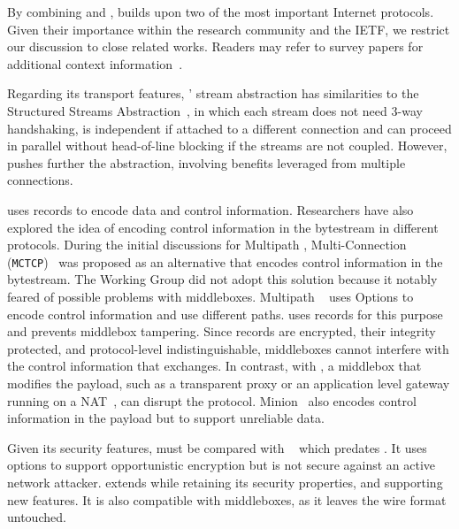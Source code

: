 
By combining \tcp and \tls, \tcpls builds upon two of the most important
Internet protocols. Given their importance within  the research community and the IETF, we restrict our discussion to close related works. Readers may refer to survey papers for additional  context
information~\cite{polese2019survey,li2016multipath,papastergiou2016ossifying}.

Regarding its transport features, \tcpls' stream abstraction has similarities to
the Structured Streams Abstraction~\cite{ford2007structured}, in which each
stream does not need 3-way handshaking, is independent if attached to a
different \tcp connection and can proceed in parallel without head-of-line
blocking if the streams are not coupled. However, \tcpls pushes further the
abstraction, involving benefits leveraged from multiple connections.

\tcpls uses \tls records to encode data and control information. Researchers
have also explored the idea of encoding control information in the \tcp
bytestream in different protocols. During the initial discussions for Multipath \tcp, Multi-Connection \tcp (\texttt{MCTCP})~\cite{draft-scharf-mptcp-mctcp-01}
was proposed as an alternative that encodes control information in the bytestream. The \mptcp Working Group did not adopt this solution because it notably feared of possible problems with middleboxes. Multipath \tcp~\cite{raiciu2012hard,rfc8684} uses \tcp Options to encode control information and use different paths. \tcpls uses \tls records for this purpose and prevents middlebox tampering. Since \tls records are encrypted, their integrity protected, and protocol-level indistinguishable, middleboxes cannot interfere with the control information that \tcpls exchanges. In contrast, with \mptcp, a middlebox that modifies the payload, such as a transparent \tcp proxy or an application level gateway running on a NAT~\cite{rfc3027}, can disrupt the
protocol. Minion~\cite{nowlan2012fitting} also encodes control information in
the \tcp payload but to support unreliable data.

Given its security features, \tcpls must be compared with
\tcpcrypt~\cite{bittau2010case,rfc8548} which predates . It uses \tcp
options to support opportunistic encryption but is not secure against an active
network attacker. \tcpls extends \tls while retaining its security  properties, 
and supporting new features. It is also compatible with middleboxes, as it 
leaves the \tcp wire format untouched.

